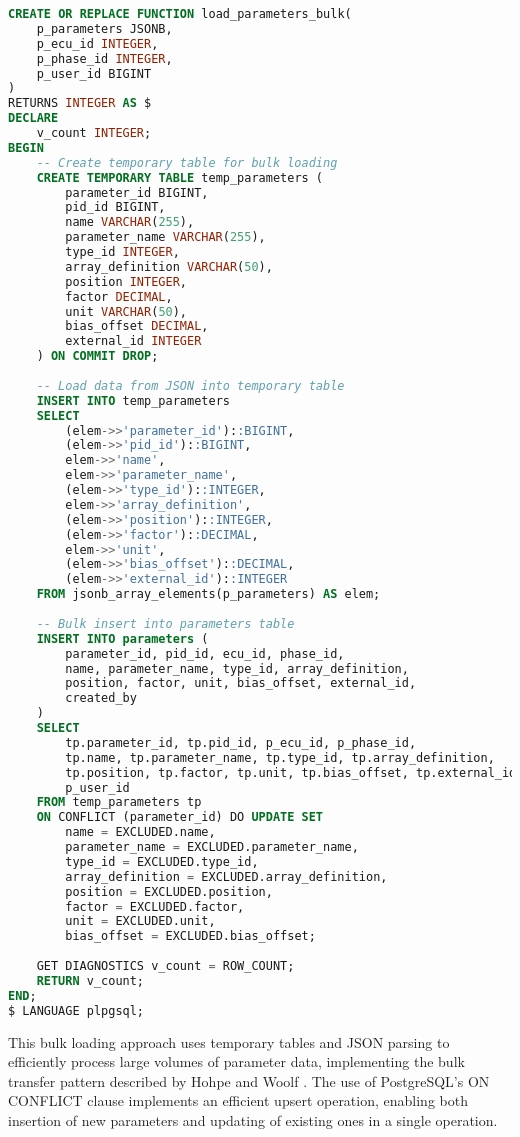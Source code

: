 \begin{lstlisting}[language=SQL, caption={Bulk Parameter Loading Implementation}, label={lst:bulk-loading}]
CREATE OR REPLACE FUNCTION load_parameters_bulk(
    p_parameters JSONB,
    p_ecu_id INTEGER,
    p_phase_id INTEGER,
    p_user_id BIGINT
)
RETURNS INTEGER AS $
DECLARE
    v_count INTEGER;
BEGIN
    -- Create temporary table for bulk loading
    CREATE TEMPORARY TABLE temp_parameters (
        parameter_id BIGINT,
        pid_id BIGINT,
        name VARCHAR(255),
        parameter_name VARCHAR(255),
        type_id INTEGER,
        array_definition VARCHAR(50),
        position INTEGER,
        factor DECIMAL,
        unit VARCHAR(50),
        bias_offset DECIMAL,
        external_id INTEGER
    ) ON COMMIT DROP;
    
    -- Load data from JSON into temporary table
    INSERT INTO temp_parameters
    SELECT 
        (elem->>'parameter_id')::BIGINT,
        (elem->>'pid_id')::BIGINT,
        elem->>'name',
        elem->>'parameter_name',
        (elem->>'type_id')::INTEGER,
        elem->>'array_definition',
        (elem->>'position')::INTEGER,
        (elem->>'factor')::DECIMAL,
        elem->>'unit',
        (elem->>'bias_offset')::DECIMAL,
        (elem->>'external_id')::INTEGER
    FROM jsonb_array_elements(p_parameters) AS elem;
    
    -- Bulk insert into parameters table
    INSERT INTO parameters (
        parameter_id, pid_id, ecu_id, phase_id, 
        name, parameter_name, type_id, array_definition,
        position, factor, unit, bias_offset, external_id,
        created_by
    )
    SELECT 
        tp.parameter_id, tp.pid_id, p_ecu_id, p_phase_id,
        tp.name, tp.parameter_name, tp.type_id, tp.array_definition,
        tp.position, tp.factor, tp.unit, tp.bias_offset, tp.external_id,
        p_user_id
    FROM temp_parameters tp
    ON CONFLICT (parameter_id) DO UPDATE SET
        name = EXCLUDED.name,
        parameter_name = EXCLUDED.parameter_name,
        type_id = EXCLUDED.type_id,
        array_definition = EXCLUDED.array_definition,
        position = EXCLUDED.position,
        factor = EXCLUDED.factor,
        unit = EXCLUDED.unit,
        bias_offset = EXCLUDED.bias_offset;
    
    GET DIAGNOSTICS v_count = ROW_COUNT;
    RETURN v_count;
END;
$ LANGUAGE plpgsql;
\end{lstlisting}

This bulk loading approach uses temporary tables and JSON parsing to efficiently process large volumes of parameter data, implementing the bulk transfer pattern described by Hohpe and Woolf \cite{hohpe2002enterprise}. The use of PostgreSQL's ON CONFLICT clause implements an efficient upsert operation, enabling both insertion of new parameters and updating of existing ones in a single operation.


